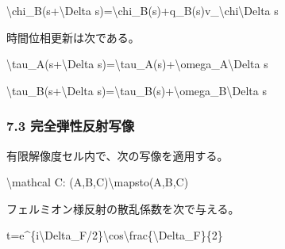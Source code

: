 \documentclass[
  a4paper,
]{article}
\newenvironment{Shaded}{}{}
\newcommand{\NormalTok}[1]{#1}
\begin{document}
\begin{Shaded}
\begin{Highlighting}[]
\NormalTok{\textbackslash{}chi\_B(s+\textbackslash{}Delta s)=\textbackslash{}chi\_B(s)+q\_B(s)v\_\textbackslash{}chi\textbackslash{}Delta s}
\end{Highlighting}
\end{Shaded}

時間位相更新は次である。

\begin{Shaded}
\begin{Highlighting}[]
\NormalTok{\textbackslash{}tau\_A(s+\textbackslash{}Delta s)=\textbackslash{}tau\_A(s)+\textbackslash{}omega\_A\textbackslash{}Delta s}
\end{Highlighting}
\end{Shaded}

\begin{Shaded}
\begin{Highlighting}[]
\NormalTok{\textbackslash{}tau\_B(s+\textbackslash{}Delta s)=\textbackslash{}tau\_B(s)+\textbackslash{}omega\_B\textbackslash{}Delta s}
\end{Highlighting}
\end{Shaded}

\subsubsection{7.3
完全弾性反射写像}\label{ux5b8cux5168ux5f3eux6027ux53cdux5c04ux5199ux50cf}

有限解像度セル内で、次の写像を適用する。

\begin{Shaded}
\begin{Highlighting}[]
\NormalTok{\textbackslash{}mathcal C:}
\NormalTok{(A\textquotesingle{},B\textquotesingle{},C\textquotesingle{})\textbackslash{}mapsto(A\textquotesingle{}\textquotesingle{},B\textquotesingle{}\textquotesingle{},C\textquotesingle{}\textquotesingle{})}
\end{Highlighting}
\end{Shaded}

フェルミオン様反射の散乱係数を次で与える。

\begin{Shaded}
\begin{Highlighting}[]
\NormalTok{t=e\^{}\{i\textbackslash{}Delta\_F/2\}\textbackslash{}cos\textbackslash{}frac\{\textbackslash{}Delta\_F\}\{2\}}
\end{Highlighting}
\end{Shaded}
\end{document}
